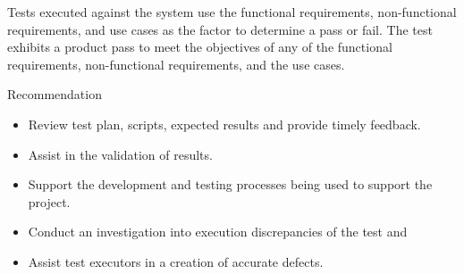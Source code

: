 Tests executed against the system use the functional requirements, non-functional requirements, and use cases as the factor to determine a pass or fail.
The test exhibits a product pass to meet the objectives of any of the functional requirements, non-functional requirements, and the use cases.

Recommendation
\begin{itemize}
    \item Review test plan, scripts, expected results and provide timely feedback. 
    \item Assist in the validation of results.
    \item Support the development and testing processes being used to support the project.
    \item Conduct an investigation into execution discrepancies of the test and
    \item Assist test executors in a creation of accurate defects.
\end{itemize}